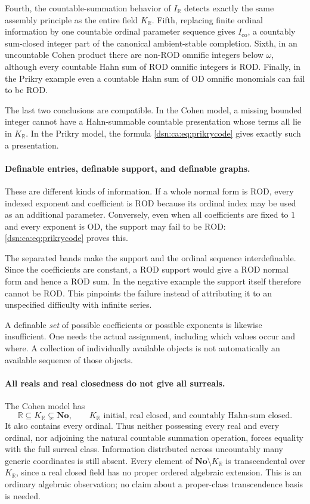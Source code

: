 \documentclass[11pt,a4paper]{article}
\numberwithin{equation}{section}
\theoremstyle{definition}
\theoremstyle{remark}
\newcommand{\No}{\mathbf{No}}
\newcommand{\OD}{\mathrm{OD}}
\newcommand{\R}{\mathbb R}
\newcommand{\ROD}{\mathrm{ROD}}
\newcommand{\KR}{K_{\R}}
\newcommand{\IR}{I_{\R}}
\newcommand{\Ico}{I_{\mathrm{co}}}
\begin{document}
Fourth, the countable-summation behavior of $\IR$ detects exactly the
same assembly principle as the entire field $\KR$.
Fifth, replacing finite ordinal information by one countable ordinal
parameter sequence gives $\Ico$, a countably sum-closed integer part
of the canonical ambient-stable completion.
Sixth, in an uncountable Cohen product there are non-$\ROD$ omnific
integers below $\omega$, although every countable Hahn sum of $\ROD$
omnific integers is $\ROD$.
Finally, in the Prikry example even a countable Hahn sum of $\OD$
omnific monomials can fail to be $\ROD$.

The last two conclusions are compatible. In the Cohen model, a missing
bounded integer cannot have a Hahn-summable countable presentation whose
terms all lie in $\KR$. In the Prikry model, the formula
\eqref{dsn:ca:eq:prikrycode} gives exactly such a presentation.
\paragraph{Definable entries, definable support, and definable graphs.}
These are different kinds of information. If a whole normal form is
$\ROD$, every indexed exponent and coefficient is $\ROD$ because its
ordinal index may be used as an additional parameter. Conversely, even
when all coefficients are fixed to $1$ and every exponent is $\OD$,
the support may fail to be $\ROD$: \eqref{dsn:ca:eq:prikrycode} proves this.

The separated bands make the support and the ordinal sequence
interdefinable. Since the coefficients are constant, a $\ROD$ support
would give a $\ROD$ normal form and hence a $\ROD$ sum. In the negative
example the support itself therefore cannot be $\ROD$. This pinpoints
the failure instead of attributing it to an unspecified difficulty with
infinite series.

A definable \emph{set} of possible coefficients or possible exponents
is likewise insufficient. One needs the actual assignment, including
which values occur and where. A collection of individually available
objects is not automatically an available sequence of those objects.
\paragraph{All reals and real closedness do not give all surreals.}
The Cohen model has
\[
 \R\subseteq\KR\subsetneq\No,
 \qquad \KR\text{ initial, real closed, and countably Hahn-sum closed}.
\]
It also contains every ordinal. Thus neither possessing every real and
every ordinal, nor adjoining the natural countable summation operation,
forces equality with the full surreal class. Information distributed
across uncountably many generic coordinates is still absent.
Every element of $\No\setminus\KR$ is transcendental over $\KR$,
since a real closed field has no proper ordered algebraic extension.
This is an ordinary algebraic observation; no claim about a
proper-class transcendence basis is needed.
\end{document}
